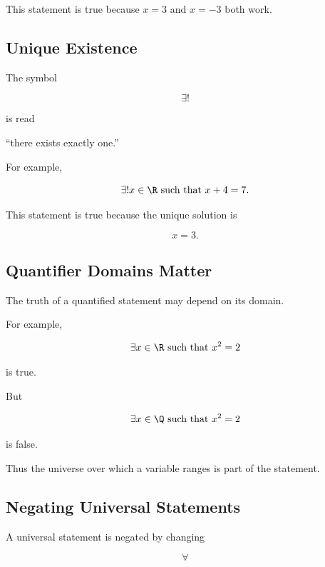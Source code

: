 This statement is true because \(x=3\) and \(x=-3\) both work.

\subsection{Unique Existence}
\label{subsec:unique-existence}

The symbol

\[ \exists! \]

is read

\begin{center}
``there exists exactly one.''
\end{center}

For example,

\[ \exists!x\in\R\text{ such that }x+4=7. \]

This statement is true because the unique solution is

\[ x=3. \]

\subsection{Quantifier Domains Matter}
\label{subsec:quantifier-domains}

The truth of a quantified statement may depend on its domain.

For example,

\[ \exists x\in\R\text{ such that }x^2=2 \]

is true.

But

\[ \exists x\in\Q\text{ such that }x^2=2 \]

is false.

Thus the universe over which a variable ranges is part of the statement.

\subsection{Negating Universal Statements}
\label{subsec:negating-universal}

A universal statement is negated by changing

\[ \forall \]

